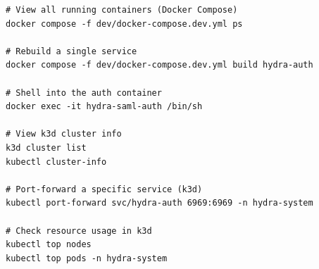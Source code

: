 \documentclass[11pt,a4paper]{article}
\begin{document}
\begin{lstlisting}[style=bash]
# View all running containers (Docker Compose)
docker compose -f dev/docker-compose.dev.yml ps

# Rebuild a single service
docker compose -f dev/docker-compose.dev.yml build hydra-auth

# Shell into the auth container
docker exec -it hydra-saml-auth /bin/sh

# View k3d cluster info
k3d cluster list
kubectl cluster-info

# Port-forward a specific service (k3d)
kubectl port-forward svc/hydra-auth 6969:6969 -n hydra-system

# Check resource usage in k3d
kubectl top nodes
kubectl top pods -n hydra-system
\end{lstlisting}
\end{document}
